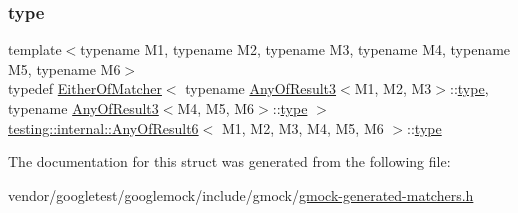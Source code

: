 \subsubsection{\texorpdfstring{type}{type}}
{\footnotesize\ttfamily template$<$typename M1, typename M2, typename M3, typename M4, typename M5, typename M6$>$ \\
typedef \hyperlink{classtesting_1_1internal_1_1_either_of_matcher}{Either\+Of\+Matcher}$<$ typename \hyperlink{structtesting_1_1internal_1_1_any_of_result3}{Any\+Of\+Result3}$<$M1, M2, M3$>$\+::\hyperlink{structtesting_1_1internal_1_1_any_of_result6_a15837eb05d9ac5a76c20d344a4988dd1}{type}, typename \hyperlink{structtesting_1_1internal_1_1_any_of_result3}{Any\+Of\+Result3}$<$M4, M5, M6$>$\+::\hyperlink{structtesting_1_1internal_1_1_any_of_result6_a15837eb05d9ac5a76c20d344a4988dd1}{type} $>$ \hyperlink{structtesting_1_1internal_1_1_any_of_result6}{testing\+::internal\+::\+Any\+Of\+Result6}$<$ M1, M2, M3, M4, M5, M6 $>$\+::\hyperlink{structtesting_1_1internal_1_1_any_of_result6_a15837eb05d9ac5a76c20d344a4988dd1}{type}}



The documentation for this struct was generated from the following file\+:\begin{DoxyCompactItemize}
\item 
vendor/googletest/googlemock/include/gmock/\hyperlink{gmock-generated-matchers_8h}{gmock-\/generated-\/matchers.\+h}\end{DoxyCompactItemize}
